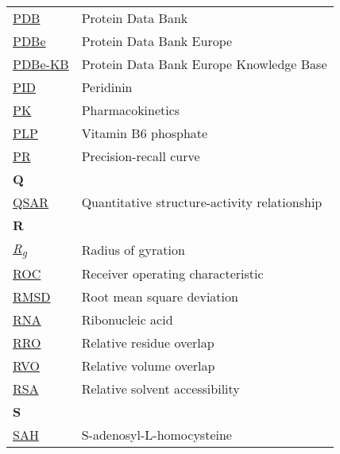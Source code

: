 \begin{longtable}[l]{@{}p{2.5cm}p{12cm}@{}}
\textmd{\href{https://en.wikipedia.org/wiki/Protein_Data_Bank}{PDB}} & Protein Data Bank \\
\textmd{\href{https://www.ebi.ac.uk/pdbe/}{PDBe}} & Protein Data Bank Europe \\
\textmd{\href{https://www.ebi.ac.uk/pdbe/pdbe-kb/}{PDBe-KB}} & Protein Data Bank Europe Knowledge Base \\
\textmd{\href{https://www.ebi.ac.uk/pdbe-srv/pdbechem/chemicalCompound/show/PID}{PID}} & Peridinin \\
\textmd{\href{https://en.wikipedia.org/wiki/Pharmacokinetics}{PK}} & Pharmacokinetics \\
\textmd{\href{https://www.ebi.ac.uk/pdbe-srv/pdbechem/chemicalCompound/show/PLP}{PLP}} & Vitamin B6 phosphate \\
\textmd{\href{https://en.wikipedia.org/wiki/Precision_and_recall}{PR}} & Precision-recall curve \\[0.3175cm]
\textbf{\large Q} & \\[0.25cm]
\textmd{\href{https://en.wikipedia.org/wiki/Quantitative_structure–activity_relationship}{QSAR}} & Quantitative structure-activity relationship \\[0.3175cm]
\textbf{\large R} & \\[0.25cm]
\textmd{\href{https://en.wikipedia.org/wiki/Radius_of_gyration}{\textit{R\textsubscript{g}}}} & Radius of gyration \\
\textmd{\href{https://en.wikipedia.org/wiki/Receiver_operating_characteristic}{ROC}} & Receiver operating characteristic \\
\textmd{\href{https://en.wikipedia.org/wiki/Root_mean_square_deviation}{RMSD}} & Root mean square deviation \\
\textmd{\href{https://en.wikipedia.org/wiki/RNA}{RNA}} & Ribonucleic acid \\
\textmd{\href{https://jcheminf.biomedcentral.com/articles/10.1186/s13321-024-00923-z}{RRO}} & Relative residue overlap \\
\textmd{\href{https://jcheminf.biomedcentral.com/articles/10.1186/s13321-024-00923-z}{RVO}} & Relative volume overlap \\
\textmd{\href{https://en.wikipedia.org/wiki/Relative_accessible_surface_area}{RSA}} & Relative solvent accessibility \\[0.3175cm]
\textbf{\large S} & \\[0.25cm]
\textmd{\href{https://www.ebi.ac.uk/pdbe-srv/pdbechem/chemicalCompound/show/SAH}{SAH}} & S-adenosyl-L-homocysteine \\

\end{longtable}
